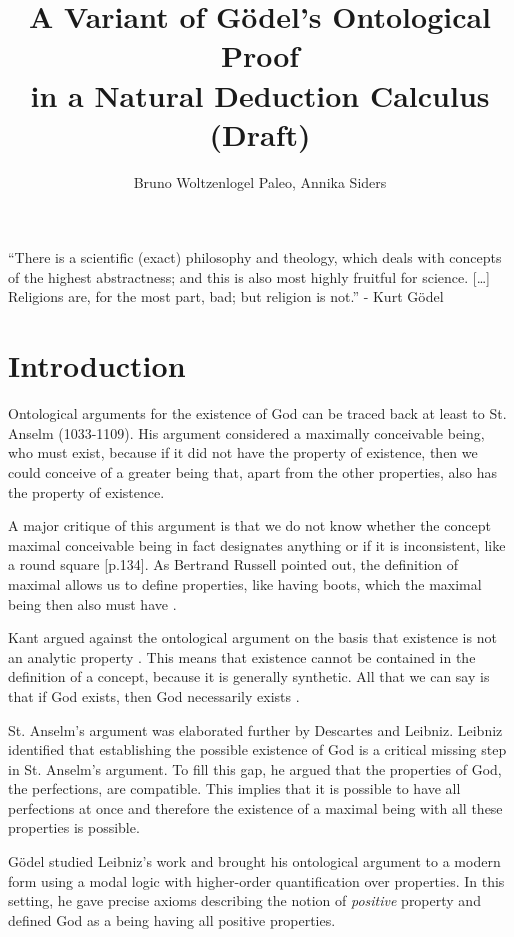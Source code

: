 \documentclass{llncs}
\title{A Variant of G\"{o}del's Ontological Proof \\
in a Natural Deduction Calculus \\
(Draft)}
\author{Bruno Woltzenlogel Paleo, Annika Siders}
\begin{document}
\maketitle

\newcommand{\ess}[2]{#1 \ \mathit{ess} \ #2}
\newcommand{\NE}{E}


\noindent
``There is a scientific (exact) philosophy and theology,
which deals with concepts of the highest abstractness; and this is also most highly fruitful for science. [\ldots] Religions are, for the most part, bad; but religion is not.'' - Kurt G\"{o}del

\section{Introduction}

Ontological arguments for the existence of God can be traced back at least to St. Anselm (1033-1109). His argument considered a maximally conceivable being, who must exist, because if it did not have the property of existence, then we could conceive of a greater being that, apart from the other properties, also has the property of existence. 

A major critique of this argument is that we do not know whether the concept maximal conceivable being in fact designates anything or if it is inconsistent, like a round square \citep{fitting}[p.134].  
As Bertrand Russell pointed out, the definition of maximal allows us to define properties, like having boots, which the maximal being then also must have \citep{citation needed}. 

Kant argued against the ontological argument on the basis that existence is not an analytic property \citep{kant}. This means that existence cannot be contained in the definition of a concept, because it is generally synthetic. All that we can say is that if God exists, then God necessarily exists \citep{citation needed}.

St. Anselm's argument was elaborated further by Descartes and Leibniz. Leibniz identified that establishing the possible existence of God is a critical missing step in St. Anselm's argument. To fill this gap, he argued that the properties of God, the perfections, are compatible. This implies that it is possible to have all perfections at once and therefore the existence of a maximal being with all these properties is possible. 

G\"odel studied Leibniz's work \citep{Adams} and brought his ontological argument to a modern form using a modal logic with higher-order quantification over properties. In this setting, he gave precise axioms describing the notion of \emph{positive} property and defined God as a being having all positive properties. 
\end{document}
